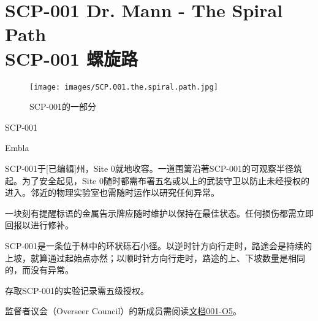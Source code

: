 \chapter[SCP-001 螺旋路]{
	SCP-001 Dr. Mann - The Spiral Path \\
	SCP-001 螺旋路
}

\label{chap:SCP-001.the.spiral.path}

\begin{figure}[H]
	\centering
	\texttt{[image: images/SCP.001.the.spiral.path.jpg]}
	\caption*{SCP-001的一部分}
\end{figure}

SCP-001

Embla

SCP-001于[已编辑]州，Site 0就地收容。一道围篱沿著SCP-001的可观察半径筑起。为了安全起见，Site 0随时都需布署五名或以上的武装守卫以防止未经授权的进入。邻近的物理实验室也需随时运作以研究任何异常。

一块刻有提醒标语的金属告示牌应随时维护以保持在最佳状态。任何损伤都需立即回报以进行修补。

SCP-001是一条位于林中的环状砾石小径。以逆时针方向行走时，路途会是持续的上坡，就算通过起始点亦然；以顺时针方向行走时，路途的上、下坡数量是相同的，而没有异常。

存取SCP-001的实验记录需五级授权。

监督者议会（Overseer Council）的新成员需阅读\hyperref[sec:DOC-001-05]{文档001-O5}。

\newpage

